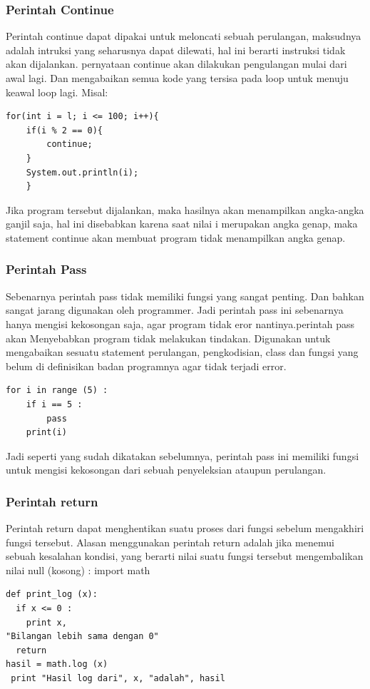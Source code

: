 \subsubsection{Perintah Continue}
Perintah continue dapat dipakai untuk meloncati sebuah perulangan, maksudnya adalah intruksi yang seharusnya dapat dilewati, hal ini berarti instruksi tidak akan dijalankan\cite{arfian2012rekayasa}. pernyataan continue akan dilakukan pengulangan mulai dari awal lagi. Dan mengabaikan semua kode yang tersisa pada loop untuk menuju keawal loop lagi.
Misal:
\begin{verbatim}
for(int i = l; i <= 100; i++){
    if(i % 2 == 0){
        continue;
    }
    System.out.println(i);
    }
\end{verbatim}

Jika program tersebut dijalankan, maka hasilnya akan menampilkan angka-angka ganjil saja, hal ini disebabkan karena saat nilai i merupakan angka genap, maka statement continue akan membuat program tidak menampilkan angka genap.

\subsubsection{Perintah Pass}
Sebenarnya perintah pass tidak memiliki fungsi yang sangat penting. Dan bahkan sangat jarang digunakan oleh programmer. Jadi perintah pass ini sebenarnya hanya mengisi kekosongan saja, agar program tidak eror nantinya.perintah pass akan Menyebabkan program tidak melakukan tindakan. Digunakan untuk mengabaikan sesuatu statement perulangan, pengkodisian, class dan fungsi yang belum di definisikan badan programnya agar tidak terjadi error.
\begin{verbatim}
for i in range (5) :
    if i == 5 :
        pass
    print(i)
    \end{verbatim}

Jadi seperti yang sudah dikatakan sebelumnya, perintah pass ini memiliki fungsi untuk mengisi kekosongan dari sebuah penyeleksian ataupun perulangan.

 \subsubsection{Perintah return}
Perintah return dapat menghentikan suatu proses dari fungsi sebelum mengakhiri fungsi tersebut. Alasan menggunakan perintah return adalah jika menemui sebuah kesalahan kondisi, yang berarti nilai suatu fungsi tersebut mengembalikan nilai null (kosong) : 
import math
\begin{verbatim}
def print_log (x):
  if x <= 0 :
    print x, 
"Bilangan lebih sama dengan 0"  
  return  
hasil = math.log (x) 
 print "Hasil log dari", x, "adalah", hasil 
 \end{verbatim}
 
